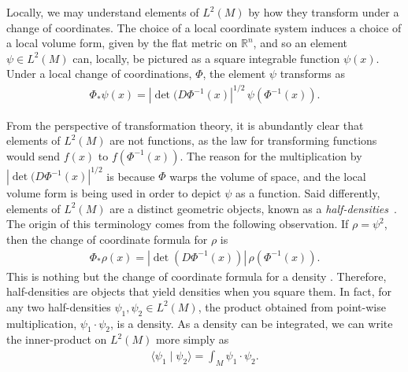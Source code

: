 \documentclass[final,leqno]{siamart}
\begin{document}
Locally, we may understand elements of $L^2(M)$ by how they transform under a change of coordinates.
The choice of a local coordinate system induces a choice of a local volume form, given by the flat metric on $\mathbb{R}^n$,
and so an element $\psi \in L^2(M)$ can, locally, be pictured as a square integrable function $\psi(x)$.
Under a local change of coordinations, $\Phi$, the element $\psi$ transforms as
\begin{align}
	\Phi_*\psi(x) = | \det( D\Phi^{-1}(x) |^{1/2} \, \psi( \Phi^{-1}(x) ). \label{eq:coordinate transformation}
\end{align}

From the perspective of transformation theory, it is abundantly clear that elements of $L^2(M)$ are not functions,
as the law for transforming functions would send $f(x)$ to $f( \Phi^{-1}(x))$.
The reason for the multiplication by $| \det( D\Phi^{-1}(x) |^{1/2}$ is because $\Phi$ warps the volume of space, and the local volume form is being used in order to depict $\psi$ as a function.
Said differently, elements of $L^2(M)$ are a distinct geometric objects, known as a \emph{half-densities}~\cite{BatesWeinstein1997,GuilleminSternberg1970}.
The origin of this terminology comes from the following observation.  If $\rho = \psi^2$, then the change of coordinate formula for $\rho$ is
\begin{align*}
	\Phi_*\rho(x) = | \det( D\Phi^{-1}(x)) | \, \rho( \Phi^{-1}(x) ).
\end{align*}
This is nothing but the change of coordinate formula for a density \cite{Lee2006}.
Therefore, half-densities are objects that yield densities when you square them.
In fact, for any two half-densities $\psi_1, \psi_2 \in L^2(M)$, the product obtained from point-wise multiplication, $\psi_1 \cdot \psi_2$,  is a density.
As a density can be integrated, we can write the inner-product on $L^2(M)$ more simply as
\begin{align*}
	\langle \psi_1 \mid \psi_2 \rangle = \int_M \psi_1 \cdot \psi_2.
\end{align*}
\end{document}
